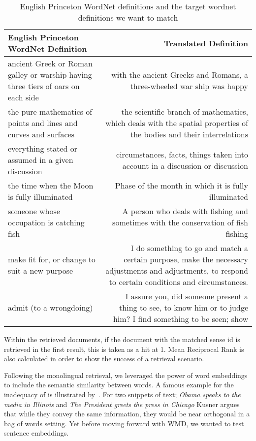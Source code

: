 \begin{table}[htbp]
    \centering
    \begin{tabulary}{\textwidth}{LR}
        \toprule%
        \textbf{English Princeton WordNet Definition} & \textbf{Translated Definition} \\
        \midrule%
        ancient Greek or Roman galley or warship having three tiers of oars on each side & with the ancient Greeks and Romans, a three-wheeled war ship was happy \\
        \cmidrule(rl){1-2}
        the pure mathematics of points and lines and curves and surfaces & the scientific branch of mathematics, which deals with the spatial properties of the bodies and their interrelations \\
        \cmidrule(rl){1-2}
        everything stated or assumed in a given discussion & circumstances, facts, things taken into account in a discussion or discussion \\
        \cmidrule(rl){1-2}
        the time when the Moon is fully illuminated & Phase of the month in which it is fully illuminated \\
        \cmidrule(rl){1-2}
        someone whose occupation is catching fish & A person who deals with fishing and sometimes with the conservation of fish fishing \\
        \cmidrule(rl){1-2}
        make fit for, or change to suit a new purpose & I do something to go and match a certain purpose, make the necessary adjustments and adjustments, to respond to certain conditions and circumstances. \\
        \cmidrule(rl){1-2}
        admit (to a wrongdoing) & I assure you, did someone present a thing to see, to know him or to judge him? I find something to be seen; show \\
        \bottomrule %
    \end{tabulary}%
    \caption{English Princeton WordNet definitions and the target wordnet definitions we want to match}%
    \label{tab:pwn_translated}
\end{table}

Within the retrieved documents, if the document with the matched sense id is retrieved in the first result, this is taken as a hit at 1.
Mean Reciprocal Rank is also calculated in order to show the success of a retrieval scenario.

Following the monolingual retrieval, we leveraged the power of word embeddings to include the semantic similarity between words.
A famous example for the inadequacy of \tfidf{} is illustrated by~\cite{kusner_word_2015}.
For two snippets of text; \emph{Obama speaks to the media in Illinois} and \emph{The President greets the press in Chicago} Kusner argues that while they convey the same information, they would be near orthogonal in a bag of words setting.
Yet before moving forward with WMD, we wanted to test sentence embeddings.

